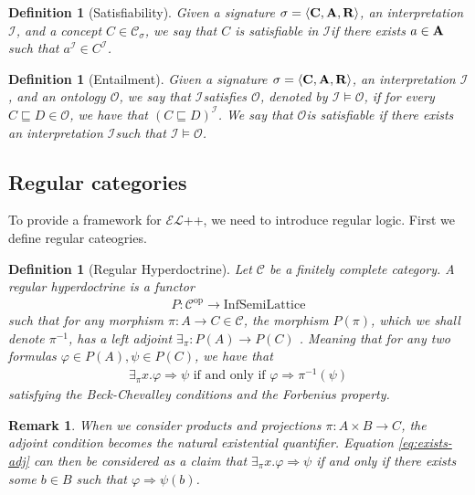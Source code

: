 \documentclass[12pt]{article}
\newtheorem{definition}[theorem]{Definition}
\newtheorem{remark}[theorem]{Remark}
\newcommand{\ELt}{$\mathcal{EL}$++}
\newcommand{\concepts}{{\bf C}}
\newcommand{\individuals}{{\bf A}}
\newcommand{\roles}{{\bf R}}
\newcommand{\tuple}[1]{\langle #1 \rangle}
\newcommand{\ontology}{\mathcal{O}}
\newcommand{\ontologyt}{$\mathcal{O}$}
\newcommand{\interpetation}{\mathcal{I}}
\newcommand{\interpetationt}{$\mathcal{I}$}
\newcommand{\InfSemiLattice}{\text{InfSemiLattice}}
\begin{document}
\begin{definition}[Satisfiability]
    Given a signature $\sigma=\tuple{\concepts, \individuals, \roles}$,
    an interpretation \interpetationt, and a concept $C\in\mathcal{C}_\sigma$,
    we say that $C$ is satisfiable in \interpetationt if there exists
    $a\in\individuals$ such that $a^\mathcal{I} \in C^\mathcal{I}$.
\end{definition}
\begin{definition}[Entailment]
    Given a signature $\sigma=\tuple{\concepts, \individuals, \roles}$,
    an interpretation \interpetationt, and an ontology \ontologyt,
    we say that \interpetationt satisfies \ontologyt, denoted by
    $\interpetation \models \ontology$, if for every $C\sqsubseteq D\in\ontology$,
    we have that $(C\sqsubseteq D)^\mathcal{I}$.
    We say that \ontologyt is satisfiable if there exists an interpretation
    \interpetationt such that $\interpetation \models \ontology$.
\end{definition}

\subsection{Regular categories}
To provide a framework for \ELt, we need to introduce regular logic.
First we define regular cateogries.

\begin{definition}[Regular Hyperdoctrine]
Let $\mathcal{C}$ be a finitely complete category.
A regular hyperdoctrine is
a functor
\begin{align*}
    P:\mathcal{C}^{\text{op}}\to \InfSemiLattice
\end{align*}
such that for any morphism $\pi: A\to C \in\mathcal{C}$,
the morphism $P(\pi)$, which we shall denote $\pi^{-1}$, has a left adjoint $\exists_\pi:P(A)\to P(C)$
 .
Meaning that for any two formulas $\varphi\in P(A),\psi\in P(C)$, we have that
\begin{gather}
    \exists_\pi x.\varphi\Rightarrow\psi\text{ if and only if }\varphi\Rightarrow\pi^{-1}(\psi)\label{eq:exists-adj}
\end{gather}
satisfying the Beck-Chevalley conditions and the Forbenius property.
\end{definition}
\begin{remark}
When we consider products and projections $\pi:A\times B\to C$, the adjoint condition becomes the 
natural existential quantifier.
Equation \ref*{eq:exists-adj} can then be considered as a claim that 
$\exists_\pi x.\varphi\Rightarrow\psi$ if and only if there exists some $b\in B$
such that $\varphi\Rightarrow\psi(b)$.
\end{remark}
\end{document}
